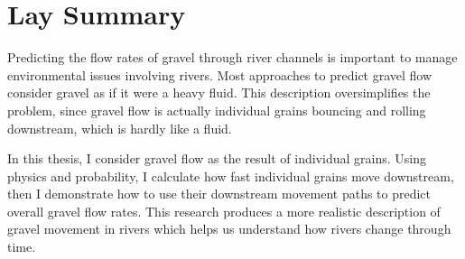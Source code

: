 

\chapter{Lay Summary}

Predicting the flow rates of gravel through river channels is important to manage environmental issues involving rivers.
Most approaches to predict gravel flow consider gravel as if it were a heavy fluid.
This description oversimplifies the problem, since gravel flow is actually individual grains bouncing and rolling downstream, which is hardly like a fluid.

In this thesis, I consider gravel flow as the result of individual grains. Using physics and probability, I calculate how fast individual grains move downstream, then I demonstrate how to use their downstream movement paths to predict overall gravel flow rates.
This research produces a more realistic description of gravel movement in rivers which helps us understand how rivers change through time.

